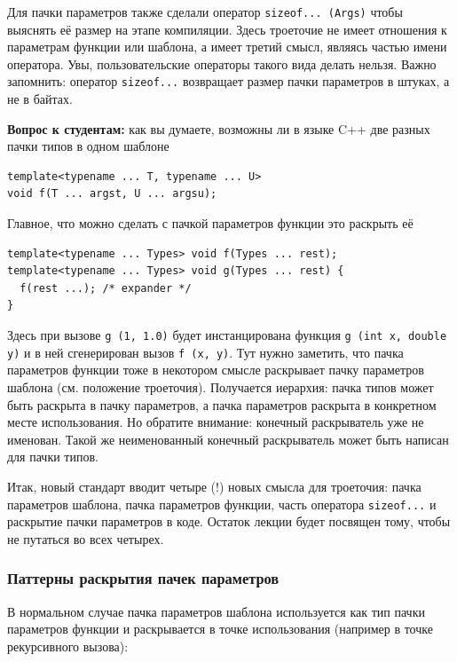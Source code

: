 \documentclass[a4paper,12pt,oneside]{article}
\newif\ifanswers
\begin{document}
Для пачки параметров также сделали оператор \lstinline!sizeof... (Args)! чтобы выяснять её размер на этапе компиляции. Здесь троеточие не имеет отношения к параметрам функции или шаблона, а имеет третий смысл, являясь частью имени оператора. Увы, пользовательские операторы такого вида делать нельзя. Важно запомнить: оператор \lstinline!sizeof...! возвращает размер пачки параметров в штуках, а не в байтах.

\textbf{Вопрос к студентам:} как вы думаете, возможны ли в языке C++ две разных пачки типов в одном шаблоне

\begin{lstlisting}
template<typename ... T, typename ... U>
void f(T ... argst, U ... argsu);
\end{lstlisting}

\ifanswers
Правильный ответ: нет, это ошибка, их нельзя различить во время исполнения.
\fi

Главное, что можно сделать с пачкой параметров функции это раскрыть её

\begin{lstlisting}
template<typename ... Types> void f(Types ... rest);
template<typename ... Types> void g(Types ... rest) {
  f(rest ...); /* expander */
}
\end{lstlisting}

Здесь при вызове \lstinline!g (1, 1.0)! будет инстанцирована функция \lstinline!g (int x, double y)! и в ней сгенерирован вызов \lstinline!f (x, y)!. Тут нужно заметить, что пачка параметров функции тоже в некотором смысле раскрывает пачку параметров шаблона (см. положение троеточия). Получается иерархия: пачка типов может быть раскрыта в пачку параметров, а пачка параметров раскрыта в конкретном месте использования. Но обратите внимание: конечный раскрыватель уже не именован. Такой же неименованный конечный раскрыватель может быть написан для пачки типов.

Итак, новый стандарт вводит четыре (!) новых смысла для троеточия: пачка параметров шаблона, пачка параметров функции, часть оператора \lstinline!sizeof...! и раскрытие пачки параметров в коде. Остаток лекции будет посвящен тому, чтобы не путаться во всех четырех.

\subsubsection{Паттерны раскрытия пачек параметров}

В нормальном случае пачка параметров шаблона используется как тип пачки параметров функции и раскрывается в точке использования (например в точке рекурсивного вызова):
\end{document}
